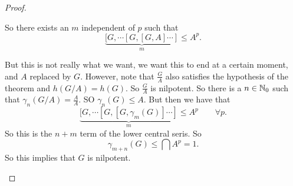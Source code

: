 \begin{proof}
\begin{itemize}
             So there exists an $m$ independent of $p$ such that
             \[
                 \underbrace{[G, \cdots [G, [G, A]\cdots]}_{m} \le  A^{p}
             .\] 
             
             But this is not really what we want,  we want this to end at a certain moment, and $A$ replaced by $G$.
             However, note that $\frac{G}{A}$ also satisfies the hypothesis of the theorem and $h(G / A) = h(G)$.
             So $\frac{G}{A}$ is nilpotent.
             So there is a $n \in \mathbb{N}_0$ such that $\gamma_n(G / A)  = \frac{A}{A}$. SO $\gamma_n(G) \le A$.
             But then we have that
             \[
                 \underbrace{[G, \cdots [G, [G, \gamma_m(G) ]\cdots]}_{m} \le  A^{p} \qquad \forall p
             .\] 
             So this is the $n + m$ term of the lower central seris.
             So 
              \[
                  \gamma_{m+n}(G) \le  \bigcap A^{p} = 1
             .\] 
             So this implies that $G$ is nilpotent.
    \end{itemize}
\end{proof}


